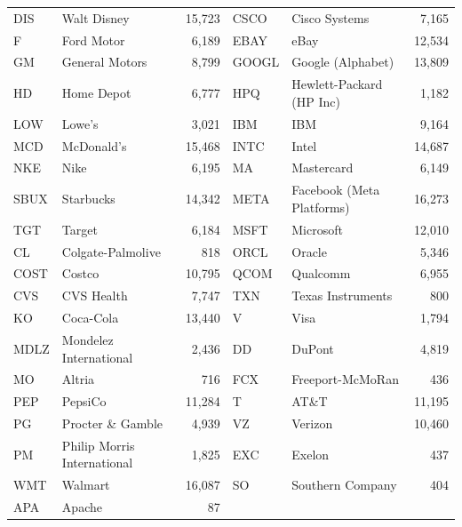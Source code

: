 \begin{tabular}{llrllr}
DIS & Walt Disney & 15,723 & CSCO & Cisco Systems & 7,165 \\
F & Ford Motor & 6,189 & EBAY & eBay & 12,534 \\
GM & General Motors & 8,799 & GOOGL & Google (Alphabet) & 13,809 \\
HD & Home Depot & 6,777 & HPQ & Hewlett-Packard (HP Inc) & 1,182 \\
LOW & Lowe's & 3,021 & IBM & IBM & 9,164 \\
MCD & McDonald's & 15,468 & INTC & Intel & 14,687 \\
NKE & Nike & 6,195 & MA & Mastercard & 6,149 \\
SBUX & Starbucks & 14,342 & META & Facebook (Meta Platforms) & 16,273 \\
TGT & Target & 6,184 & MSFT & Microsoft & 12,010 \\
CL & Colgate-Palmolive & 818 & ORCL & Oracle & 5,346 \\
COST & Costco & 10,795 & QCOM & Qualcomm & 6,955 \\
CVS & CVS Health & 7,747 & TXN & Texas Instruments & 800 \\
KO & Coca-Cola & 13,440 & V & Visa & 1,794 \\
MDLZ & Mondelez International & 2,436 & DD & DuPont & 4,819 \\
MO & Altria & 716 & FCX & Freeport-McMoRan & 436 \\
PEP & PepsiCo & 11,284 & T & AT\&T & 11,195 \\
PG & Procter \& Gamble & 4,939 & VZ & Verizon & 10,460 \\
PM & Philip Morris International & 1,825 & EXC & Exelon & 437 \\
WMT & Walmart & 16,087 & SO & Southern Company & 404 \\
APA & Apache & 87 &  &  &  \\
\bottomrule
\end{tabular}
